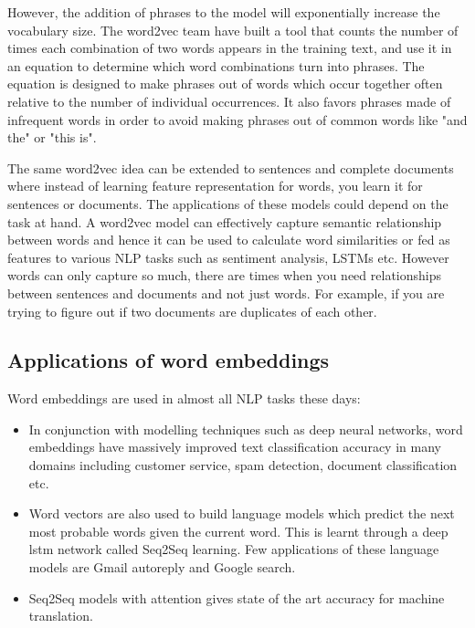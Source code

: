 However, the addition of phrases to the model will exponentially increase the vocabulary size. The word2vec team have built a tool that counts the number of times each combination of two words appears in the training text, and use it in an equation to determine which word combinations turn into phrases. The equation is designed to make phrases out of words which occur together often relative to the number of individual occurrences. It also favors phrases made of infrequent words in order to avoid making phrases out of common words like "and the" or "this is".

The same word2vec idea can be extended to sentences and complete documents where instead of learning feature representation for words, you learn it for sentences or documents. The applications of these models could depend on the task at hand. A word2vec model can effectively capture semantic relationship between words and hence it can be used to calculate word similarities or fed as features to various NLP tasks such as sentiment analysis, LSTMs etc. However words can only capture so much, there are times when you need relationships between sentences and documents and not just words. For example, if you are trying to figure out if two documents are duplicates of each other.

\subsection{Applications of word embeddings}

Word embeddings are used in almost all NLP tasks these days:

\begin{itemize}
\item In conjunction with modelling techniques such as deep neural networks, word embeddings have massively improved text classification accuracy in many domains including customer service, spam detection, document classification etc.

\item Word vectors are also used to build language models which predict the next most probable words given the current word. This is learnt through a deep lstm network called Seq2Seq learning. Few applications of these language models are Gmail autoreply and Google search.

\item Seq2Seq models with attention gives state of the art accuracy for machine translation.
\end{itemize}

